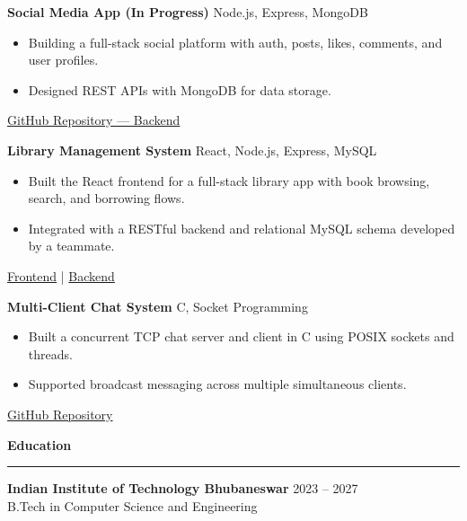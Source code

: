 \documentclass[a4paper,10pt]{article}
\begin{document}
\textbf{Social Media App (In Progress)} \hfill Node.js, Express, MongoDB \\
\begin{itemize}
    \item Building a full-stack social platform with auth, posts, likes, comments, and user profiles.
    \item Designed REST APIs with MongoDB for data storage.
\end{itemize}
\href{https://github.com/Adityaa-Saha17/Social-Media-App-Backend.git}{GitHub Repository — Backend}

\vspace{4pt}

\textbf{Library Management System} \hfill React, Node.js, Express, MySQL \\
\begin{itemize}
    \item Built the React frontend for a full-stack library app with book browsing, search, and borrowing flows.
    \item Integrated with a RESTful backend and relational MySQL schema developed by a teammate.
\end{itemize}
\href{https://github.com/Adityaa-Saha17/DBS-Project-Spring-2026-frontend.git}{Frontend} \;|\;
\href{https://github.com/jeeban-jyoti/DBS-Project-Spring-2026.git}{Backend}

\vspace{4pt}

\textbf{Multi-Client Chat System} \hfill C, Socket Programming \\
\begin{itemize}
    \item Built a concurrent TCP chat server and client in C using POSIX sockets and threads.
    \item Supported broadcast messaging across multiple simultaneous clients.
\end{itemize}
\href{https://github.com/Adityaa-Saha17/Multi-Chat-System.git}{GitHub Repository}

\vspace{7pt}

\textbf{Education} \\
\hrule
\vspace{3pt}
\textbf{Indian Institute of Technology Bhubaneswar} \hfill 2023 -- 2027 \\
B.Tech in Computer Science and Engineering

\vspace{7pt}
\end{document}
